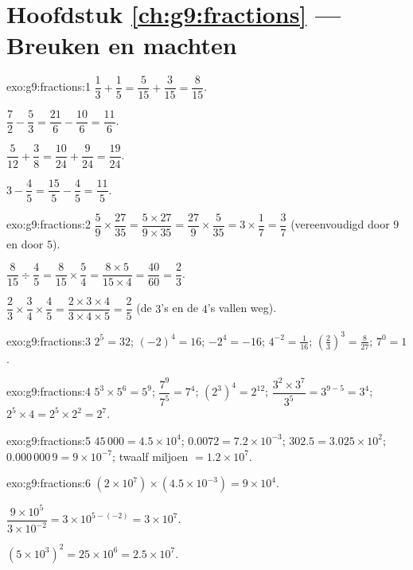 \section*{Hoofdstuk \ref{ch:g9:fractions} --- Breuken en machten}

\begin{solution}{exo:g9:fractions:1}
$\dfrac13 + \dfrac15 = \dfrac{5}{15} + \dfrac{3}{15} = \dfrac{8}{15}$.

$\dfrac72 - \dfrac53 = \dfrac{21}{6} - \dfrac{10}{6} = \dfrac{11}{6}$.

$\dfrac{5}{12} + \dfrac38 = \dfrac{10}{24} + \dfrac{9}{24} =
\dfrac{19}{24}$.

$3 - \dfrac45 = \dfrac{15}{5} - \dfrac45 = \dfrac{11}{5}$.
\end{solution}

\begin{solution}{exo:g9:fractions:2}
$\dfrac59 \times \dfrac{27}{35} = \dfrac{5 \times 27}{9 \times 35}
= \dfrac{27}{9} \times \dfrac{5}{35} = 3 \times \dfrac17 = \dfrac37$
(vereenvoudigd door $9$ en door $5$).

$\dfrac{8}{15} \div \dfrac45 = \dfrac{8}{15} \times \dfrac54
= \dfrac{8 \times 5}{15 \times 4} = \dfrac{40}{60} = \dfrac23$.

$\dfrac23 \times \dfrac34 \times \dfrac45 = \dfrac{2 \times 3 \times 4}
{3 \times 4 \times 5} = \dfrac25$ (de $3$'s en de $4$'s vallen weg).
\end{solution}

\begin{solution}{exo:g9:fractions:3}
$2^5 = 32$; \quad $(-2)^4 = 16$; \quad $-2^4 = -16$; \quad
$4^{-2} = \frac{1}{16}$; \quad
$\left(\frac23\right)^3 = \frac{8}{27}$; \quad $7^0 = 1$.
\end{solution}

\begin{solution}{exo:g9:fractions:4}
$5^3 \times 5^6 = 5^9$; \quad $\dfrac{7^9}{7^5} = 7^4$; \quad
$\left(2^3\right)^4 = 2^{12}$; \quad
$\dfrac{3^2 \times 3^7}{3^5} = 3^{9-5} = 3^4$; \quad
$2^5 \times 4 = 2^5 \times 2^2 = 2^7$.
\end{solution}

\begin{solution}{exo:g9:fractions:5}
$45\,000 = 4.5 \times 10^4$; \quad
$0.0072 = 7.2 \times 10^{-3}$; \quad
$302.5 = 3.025 \times 10^2$; \quad
$0.000\,000\,9 = 9 \times 10^{-7}$; \quad
twaalf miljoen $= 1.2 \times 10^7$.
\end{solution}

\begin{solution}{exo:g9:fractions:6}
$(2 \times 10^7) \times (4.5 \times 10^{-3}) = 9 \times 10^{4}$.

$\dfrac{9 \times 10^5}{3 \times 10^{-2}} = 3 \times 10^{5 - (-2)}
= 3 \times 10^7$.

$(5 \times 10^3)^2 = 25 \times 10^6 = 2.5 \times 10^7$.
\end{solution}

